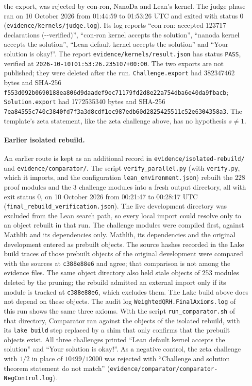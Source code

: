 \documentclass[11pt]{article}
\begin{document}
the export, was rejected by con-ron, NanoDa and Lean's kernel. The judge
phase ran on 10 October 2026 from 01:44:59 to 01:53:26 UTC and exited
with status 0 (\nolinkurl{evidence/kernels/judge.log}). Its log reports
``con-ron: accepted 123717 declarations (-{}-verified)'', ``con-ron kernel
accepts the solution'', ``nanoda kernel accepts the solution'', ``Lean
default kernel accepts the solution'' and ``Your solution is okay!''. The
report \nolinkurl{evidence/kernels/result.json} has status
\nolinkurl{PASS}, verified at \nolinkurl{2026-10-10T01:53:26.235107+00:00}.
The two exports are not published; they were deleted after the run.
\nolinkurl{Challenge.export} had 382347462 bytes and SHA-256
\nolinkurl{f553d092b0690188ea806d9daadef9ec71179fd2d8e22a754dba6e40da9fbacb};
\nolinkurl{Solution.export} had 1772535340 bytes and SHA-256
\nolinkurl{7ea84555c740c3840fd7f3a3d8cdf1ec987edb60d2825425511c52e6304358a3}.
The template's zeta statement, like the zeta challenge above, has no
hypothesis $s\ne1$.

\paragraph{Earlier isolated rebuild.}
An earlier route is kept as an additional record in
\nolinkurl{evidence/isolated-rebuild/} and \nolinkurl{evidence/comparator/}.
The script \nolinkurl{verify_parallel.py} (with \nolinkurl{verify.py},
which it imports, and the configuration \nolinkurl{lean_environment.json})
rebuilt the 228 proof modules and the 3 challenge modules into a fresh
output directory, all with exit status 0, on 10 October 2026 from
00:21:47 to 00:28:17 UTC (\nolinkurl{final_rebuild_verification.json}).
The live development directory was excluded from the Lean search path,
so every local import could resolve only to an object rebuilt in that
run. The challenge modules were compiled first, against Mathlib and its
dependencies only. Mathlib, its dependencies and the original development
entered as prebuilt objects. The source hashes recorded in the Lake build
traces of those prebuilt objects of the original development were
compared with the sources at \nolinkurl{c388e88e6} and agree; that
comparison is not among the evidence files. The same object directory
also held stale objects of 253 modules deleted by the pruning; the
rebuild admitted an external import only if its module is tracked at
\nolinkurl{c388e88e6}, which excludes them. The Lake build above does not
depend on these objects. The audit log \nolinkurl{WeightedQRH.FinalAxioms.log}
of this run shows the same three axioms. With the script
\nolinkurl{run_comparator.sh} of that directory, Comparator ran against
the objects of the isolated rebuild, with its \texttt{lake build} step
replaced by a shim that only confirms that the prebuilt objects exist.
All three challenges printed ``Lean default kernel accepts the solution''
and ``Your solution is okay!''. As a negative control, the zeta
challenge with $1/2$ in place of $10499/12000$ was rejected with
``Challenge and solution theorem statement do not match''
(\nolinkurl{evidence/comparator/comparator-NegControl.log}).
\end{document}
